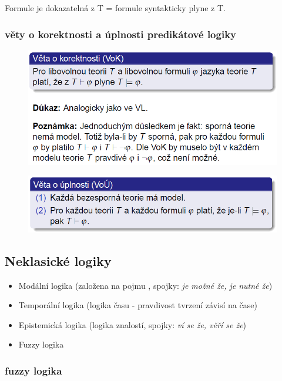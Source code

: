 \documentclass[10pt,a4paper]{article}
\theoremstyle{note}
\begin{document}
			Formule je dokazatelná z T = formule syntakticky plyne z T.


		\subsubsection{věty o korektnosti a úplnosti predikátové logiky}

			\begin{figure}[H]
			\centering
			\includegraphics[width=13cm]{img/VoKPL.png}
			\end{figure}

			\begin{figure}[H]
			\centering
			\includegraphics[width=13cm]{img/VoUPL.png}
			\end{figure}

	\subsection{Neklasické logiky}
		\begin{itemize}
			\item Modální logika (založena na pojmu , spojky:\textit{ je možné že, je nutné že})
			\item Temporální logika (logika času - pravdivost tvrzení závisí na čase)
			\item Epistemická logika (logika znalostí, spojky: \textit{ví se že, věří se že})
			\item Fuzzy logika
		\end{itemize}

		\subsubsection{fuzzy logika}
\end{document}
